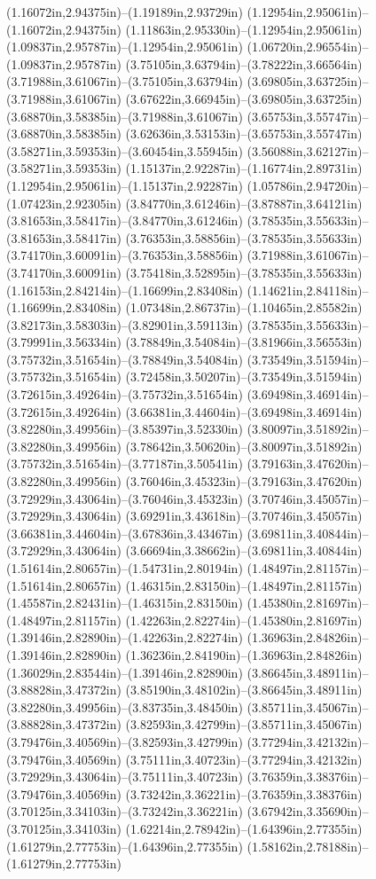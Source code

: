 (1.16072in,2.94375in)--(1.19189in,2.93729in) (1.12954in,2.95061in)--(1.16072in,2.94375in) (1.11863in,2.95330in)--(1.12954in,2.95061in) (1.09837in,2.95787in)--(1.12954in,2.95061in) (1.06720in,2.96554in)--(1.09837in,2.95787in) (3.75105in,3.63794in)--(3.78222in,3.66564in) (3.71988in,3.61067in)--(3.75105in,3.63794in) (3.69805in,3.63725in)--(3.71988in,3.61067in) (3.67622in,3.66945in)--(3.69805in,3.63725in) (3.68870in,3.58385in)--(3.71988in,3.61067in) (3.65753in,3.55747in)--(3.68870in,3.58385in) (3.62636in,3.53153in)--(3.65753in,3.55747in) (3.58271in,3.59353in)--(3.60454in,3.55945in) (3.56088in,3.62127in)--(3.58271in,3.59353in) (1.15137in,2.92287in)--(1.16774in,2.89731in) (1.12954in,2.95061in)--(1.15137in,2.92287in) (1.05786in,2.94720in)--(1.07423in,2.92305in) (3.84770in,3.61246in)--(3.87887in,3.64121in) (3.81653in,3.58417in)--(3.84770in,3.61246in) (3.78535in,3.55633in)--(3.81653in,3.58417in) (3.76353in,3.58856in)--(3.78535in,3.55633in) (3.74170in,3.60091in)--(3.76353in,3.58856in) (3.71988in,3.61067in)--(3.74170in,3.60091in) (3.75418in,3.52895in)--(3.78535in,3.55633in) (1.16153in,2.84214in)--(1.16699in,2.83408in) (1.14621in,2.84118in)--(1.16699in,2.83408in) (1.07348in,2.86737in)--(1.10465in,2.85582in) (3.82173in,3.58303in)--(3.82901in,3.59113in) (3.78535in,3.55633in)--(3.79991in,3.56334in) (3.78849in,3.54084in)--(3.81966in,3.56553in) (3.75732in,3.51654in)--(3.78849in,3.54084in) (3.73549in,3.51594in)--(3.75732in,3.51654in) (3.72458in,3.50207in)--(3.73549in,3.51594in) (3.72615in,3.49264in)--(3.75732in,3.51654in) (3.69498in,3.46914in)--(3.72615in,3.49264in) (3.66381in,3.44604in)--(3.69498in,3.46914in) (3.82280in,3.49956in)--(3.85397in,3.52330in) (3.80097in,3.51892in)--(3.82280in,3.49956in) (3.78642in,3.50620in)--(3.80097in,3.51892in) (3.75732in,3.51654in)--(3.77187in,3.50541in) (3.79163in,3.47620in)--(3.82280in,3.49956in) (3.76046in,3.45323in)--(3.79163in,3.47620in) (3.72929in,3.43064in)--(3.76046in,3.45323in) (3.70746in,3.45057in)--(3.72929in,3.43064in) (3.69291in,3.43618in)--(3.70746in,3.45057in) (3.66381in,3.44604in)--(3.67836in,3.43467in) (3.69811in,3.40844in)--(3.72929in,3.43064in) (3.66694in,3.38662in)--(3.69811in,3.40844in) (1.51614in,2.80657in)--(1.54731in,2.80194in) (1.48497in,2.81157in)--(1.51614in,2.80657in) (1.46315in,2.83150in)--(1.48497in,2.81157in) (1.45587in,2.82431in)--(1.46315in,2.83150in) (1.45380in,2.81697in)--(1.48497in,2.81157in) (1.42263in,2.82274in)--(1.45380in,2.81697in) (1.39146in,2.82890in)--(1.42263in,2.82274in) (1.36963in,2.84826in)--(1.39146in,2.82890in) (1.36236in,2.84190in)--(1.36963in,2.84826in) (1.36029in,2.83544in)--(1.39146in,2.82890in) (3.86645in,3.48911in)--(3.88828in,3.47372in) (3.85190in,3.48102in)--(3.86645in,3.48911in) (3.82280in,3.49956in)--(3.83735in,3.48450in) (3.85711in,3.45067in)--(3.88828in,3.47372in) (3.82593in,3.42799in)--(3.85711in,3.45067in) (3.79476in,3.40569in)--(3.82593in,3.42799in) (3.77294in,3.42132in)--(3.79476in,3.40569in) (3.75111in,3.40723in)--(3.77294in,3.42132in) (3.72929in,3.43064in)--(3.75111in,3.40723in) (3.76359in,3.38376in)--(3.79476in,3.40569in) (3.73242in,3.36221in)--(3.76359in,3.38376in) (3.70125in,3.34103in)--(3.73242in,3.36221in) (3.67942in,3.35690in)--(3.70125in,3.34103in) (1.62214in,2.78942in)--(1.64396in,2.77355in) (1.61279in,2.77753in)--(1.64396in,2.77355in) (1.58162in,2.78188in)--(1.61279in,2.77753in) 